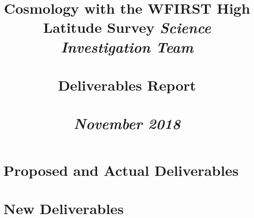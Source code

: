 \documentclass[letter]{ar-1col_WFIRST-HLS}
\begin{document}
%


\title{Cosmology with the WFIRST High Latitude Survey \emph{Science Investigation Team}\\
\\
Deliverables Report\\
\\
\emph{November 2018}}



\maketitle

\newpage


\newpage
{}

%

\section{Proposed and Actual Deliverables}
\label{sec:deliverables}


\section{New Deliverables}
\label{sec:new_deliverables}


\newpage




\clearpage
\newpage
\end{document}

